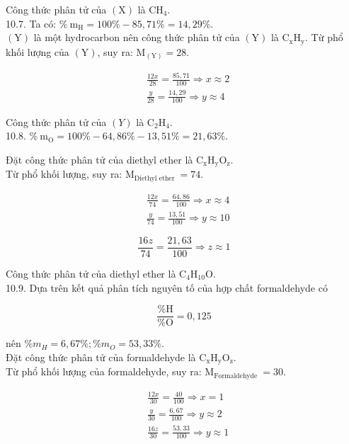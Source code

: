 \documentclass[10pt]{article}
\begin{document}
Công thức phân tử của $(\mathrm{X})$ là $\mathrm{CH}_{4}$.\\
10.7. Ta có: $\% \mathrm{~m}_{\mathrm{H}}=100 \%-85,71 \%=14,29 \%$.\\
$(\mathrm{Y})$ là một hydrocarbon nên công thức phân tử của $(\mathrm{Y})$ là $\mathrm{C}_{\mathrm{x}} \mathrm{H}_{\mathrm{y}}$. Từ phổ khối lượng của $(\mathrm{Y})$, suy ra: $\mathrm{M}_{(\mathrm{Y})}=28$.

$$
\begin{aligned}
& \frac{12 x}{28}=\frac{85,71}{100} \Rightarrow x \approx 2 \\
& \frac{y}{28}=\frac{14,29}{100} \Rightarrow y \approx 4
\end{aligned}
$$

Công thức phân tử của $(Y)$ là $\mathrm{C}_{2} \mathrm{H}_{4}$.\\
10.8. $\% \mathrm{~m}_{\mathrm{O}}=100 \%-64,86 \%-13,51 \%=21,63 \%$.

Đặt công thức phân tử của diethyl ether là $\mathrm{C}_{\mathrm{x}} \mathrm{H}_{\mathrm{y}} \mathrm{O}_{\mathrm{z}}$.\\
Từ phổ khối lượng, suy ra: $\mathrm{M}_{\text {Diethyl ether }}=74$.

$$
\begin{aligned}
& \frac{12 x}{74}=\frac{64,86}{100} \Rightarrow x \approx 4 \\
& \frac{y}{74}=\frac{13,51}{100} \Rightarrow y \approx 10
\end{aligned}
$$

$$
\frac{16 z}{74}=\frac{21,63}{100} \Rightarrow z \approx 1
$$

Công thức phân tử của diethyl ether là $\mathrm{C}_{4} \mathrm{H}_{10} \mathrm{O}$.\\
10.9. Dựa trên kết quả phân tích nguyên tố của hợp chất formaldehyde có

$$
\frac{\% \mathrm{H}}{\% \mathrm{O}}=0,125
$$

nên $\% m_{H}=6,67 \% ; \% m_{O}=53,33 \%$.\\
Đặt công thức phân tử của formaldehyde là $\mathrm{C}_{\mathrm{x}} \mathrm{H}_{\mathrm{y}} \mathrm{O}_{\mathrm{z}}$.\\
Từ phổ khối lượng của formaldehyde, suy ra: $\mathrm{M}_{\text {Formaldehyde }}=30$.

$$
\begin{aligned}
& \frac{12 x}{30}=\frac{40}{100} \Rightarrow x=1 \\
& \frac{y}{30}=\frac{6,67}{100} \Rightarrow y \approx 2 \\
& \frac{16 z}{30}=\frac{53,33}{100} \Rightarrow y \approx 1
\end{aligned}
$$
\end{document}
